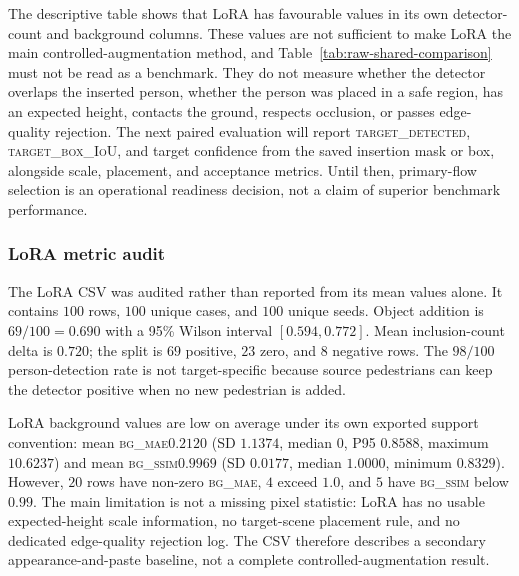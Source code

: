 \documentclass[11pt,a4paper]{article}
\newcommand{\bgmae}{\textsc{bg\_mae}\xspace}
\newcommand{\bgssim}{\textsc{bg\_ssim}\xspace}
\begin{document}
The descriptive table shows that LoRA has favourable values in its own detector-count and background columns. These values are not sufficient to make LoRA the main controlled-augmentation method, and Table~\ref{tab:raw-shared-comparison} must not be read as a benchmark. They do not measure whether the detector overlaps the inserted person, whether the person was placed in a safe region, has an expected height, contacts the ground, respects occlusion, or passes edge-quality rejection. The next paired evaluation will report \textsc{target\_detected}, \textsc{target\_box\_IoU}, and target confidence from the saved insertion mask or box, alongside scale, placement, and acceptance metrics. Until then, primary-flow selection is an operational readiness decision, not a claim of superior benchmark performance.

\subsubsection*{LoRA metric audit}
The LoRA CSV was audited rather than reported from its mean values alone. It contains $100$ rows, $100$ unique cases, and $100$ unique seeds. Object addition is $69/100=0.690$ with a 95\% Wilson interval $[0.594,0.772]$. Mean inclusion-count delta is $0.720$; the split is $69$ positive, $23$ zero, and $8$ negative rows. The $98/100$ person-detection rate is not target-specific because source pedestrians can keep the detector positive when no new pedestrian is added.

LoRA background values are low on average under its own exported support convention: mean \bgmae $0.2120$ (SD $1.1374$, median $0$, P95 $0.8588$, maximum $10.6237$) and mean \bgssim $0.9969$ (SD $0.0177$, median $1.0000$, minimum $0.8329$). However, $20$ rows have non-zero \bgmae, $4$ exceed $1.0$, and $5$ have \bgssim below $0.99$. The main limitation is not a missing pixel statistic: LoRA has no usable expected-height scale information, no target-scene placement rule, and no dedicated edge-quality rejection log. The CSV therefore describes a secondary appearance-and-paste baseline, not a complete controlled-augmentation result.
\end{document}
